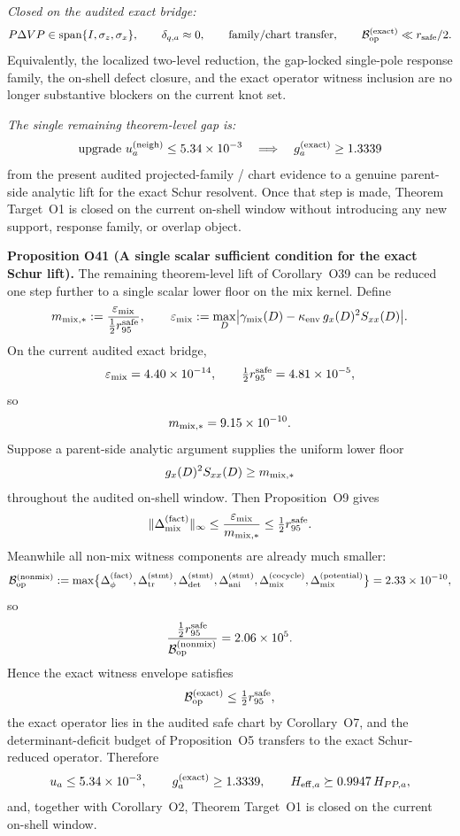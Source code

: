 \documentclass[aps,prd,onecolumn,notitlepage,nofootinbib,superscriptaddress,11pt,floatfix]{revtex4-2}
\begin{document}
\emph{Closed on the audited exact bridge:}
\[
P\Delta V P\in{\rm span}\{I,\sigma_z,\sigma_x\},
\qquad
\delta_{q,a}\approx 0,
\qquad
\text{family/chart transfer},
\qquad
\mathcal B_{\rm op}^{\rm(exact)}\ll r_{\rm safe}/2.
\]
Equivalently, the localized two-level reduction, the gap-locked single-pole response family, the on-shell defect closure, and the exact operator witness inclusion are no longer substantive blockers on the current knot set.

\emph{The single remaining theorem-level gap is:}
\[
\text{upgrade }
u_a^{(\mathrm{neigh})}\le 5.34\times10^{-3}
\quad\Longrightarrow\quad
g_a^{\rm(exact)}\ge 1.3339
\]
from the present audited projected-family / chart evidence to a genuine parent-side analytic lift for the exact Schur resolvent.  Once that step is made, Theorem Target~O1 is closed on the current on-shell window without introducing any new support, response family, or overlap object.

\medskip\noindent\textbf{Proposition O41 (A single scalar sufficient condition for the exact Schur lift).}
The remaining theorem-level lift of Corollary~O39 can be reduced one step further to a single scalar lower floor on the mix kernel.  Define
\[
m_{{\rm mix},\ast}
:=
\frac{\varepsilon_{\rm mix}}{\tfrac12 r_{95}^{\rm safe}},
\qquad
\varepsilon_{\rm mix}
:=
\max_D\bigl|\gamma_{\rm mix}(D)-\kappa_{\rm env}\,g_x(D)^2S_{xx}(D)\bigr|.
\]
On the current audited exact bridge,
\[
\varepsilon_{\rm mix}=4.40\times10^{-14},
\qquad
\tfrac12 r_{95}^{\rm safe}=4.81\times10^{-5},
\]
so
\[
m_{{\rm mix},\ast}=9.15\times10^{-10}.
\]
Suppose a parent-side analytic argument supplies the uniform lower floor
\[
g_x(D)^2S_{xx}(D)\ge m_{{\rm mix},\ast}
\]
throughout the audited on-shell window.  Then Proposition~O9 gives
\[
\|\Delta_{\rm mix}^{\rm(fact)}\|_\infty
\le
\frac{\varepsilon_{\rm mix}}{m_{{\rm mix},\ast}}
\le
\tfrac12 r_{95}^{\rm safe}.
\]
Meanwhile all non-mix witness components are already much smaller:
\[
\mathcal B_{\rm op}^{\rm(nonmix)}
:=
\max\bigl\{
\Delta_{\phi}^{\rm(fact)},
\Delta_{\rm tr}^{\rm(stmt)},
\Delta_{\rm det}^{\rm(stmt)},
\Delta_{\rm ani}^{\rm(stmt)},
\Delta_{\rm mix}^{\rm(cocycle)},
\Delta_{\rm mix}^{\rm(potential)}
\bigr\}
=2.33\times10^{-10},
\]
so
\[
\frac{\tfrac12 r_{95}^{\rm safe}}{\mathcal B_{\rm op}^{\rm(nonmix)}}
=2.06\times10^{5}.
\]
Hence the exact witness envelope satisfies
\[
\mathcal B_{\rm op}^{\rm(exact)}\le \tfrac12 r_{95}^{\rm safe},
\]
the exact operator lies in the audited safe chart by Corollary~O7, and the determinant-deficit budget of Proposition~O5 transfers to the exact Schur-reduced operator. Therefore
\[
u_a\le 5.34\times10^{-3},
\qquad
g_a^{\rm(exact)}\ge 1.3339,
\qquad
H_{{\rm eff},a}\succeq 0.9947\,H_{PP,a},
\]
and, together with Corollary~O2, Theorem Target~O1 is closed on the current on-shell window.
\end{document}
